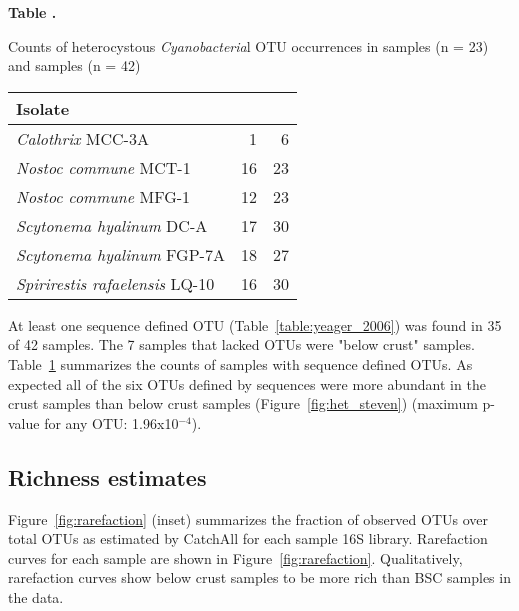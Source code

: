 \begin{table}

\textbf{
    \label{table:het_dist}
    Table .
}
    
    {Counts of heterocystous \textit{Cyanobacteria}l OTU occurrences in \citet{Garcia_Pichel_2013} samples (n = 23) and \citet{Steven_2013} samples (n = 42)}

{\centering
\begin{tabular}{lrr}
  \toprule
 Isolate & \citet{Garcia_Pichel_2013} & \citet{Steven_2013} \\ 
  \midrule
  \textit{Calothrix} MCC-3A &   1 &   6 \\ \midrule
  \textit{Nostoc commune} MCT-1 &  16 &  23 \\ \midrule
  \textit{Nostoc commune} MFG-1 &  12 &  23 \\ \midrule
  \textit{Scytonema hyalinum} DC-A &  17 &  30 \\ \midrule
  \textit{Scytonema hyalinum} FGP-7A &  18 &  27 \\ \midrule
  \textit{Spirirestis rafaelensis} LQ-10 &  16 &  30 \\
   \bottomrule
\end{tabular}}{}
\end{table}

At least one \citet{Yeager} sequence defined OTU
(Table~\ref{table:yeager_2006}) was found in 35 of 42 \citet{Steven_2013}
samples. The 7 samples that lacked \citet{Yeager} OTUs were "below crust"
samples.  Table~\ref{table:het_dist} summarizes the counts of
\citet{Steven_2013} samples with \citet{Yeager} sequence defined OTUs. As
expected all of the six OTUs defined by \citet{Yeager} sequences were more
abundant in the crust samples than below crust samples
(Figure~\ref{fig:het_steven}) (maximum p-value for any OTU: 1.96x10$^{-4}$).

\subsection{Richness estimates}
Figure~\ref{fig:rarefaction} (inset) summarizes the fraction of observed OTUs
over total OTUs as estimated by CatchAll for each sample 16S library.
Rarefaction curves for each sample are shown in Figure~\ref{fig:rarefaction}.
Qualitatively, rarefaction curves show below crust samples to be more rich than
BSC samples in the \citet{Steven_2013} data.
